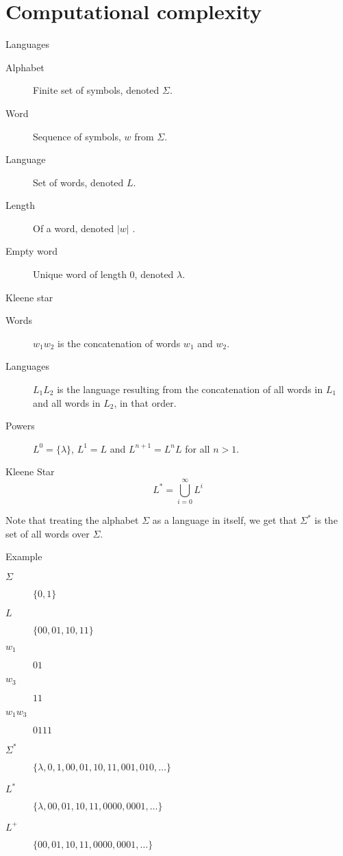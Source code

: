 
\section{Computational complexity}


\begin{frame}{Languages}
  \begin{description}
    \item[Alphabet] Finite set of symbols, denoted $\Sigma$.
    \item[Word] Sequence of symbols, $w$ from $\Sigma$.
    \item[Language] Set of words, denoted $L$.
    \item[Length] Of a word, denoted $|w|$  .
    \item[Empty word] Unique word of length 0, denoted $\lambda$.
  \end{description}
\end{frame}


\begin{frame}{Kleene star}
  \begin{description}
    \item[Words] $w_1 w_2$ is the concatenation of words $w_1$ and $w_2$.
    \item[Languages] $L_1 L_2$ is the language resulting from the concatenation of all words in $L_1$ and all words in $L_2$, in that order.
    \item[Powers] $L^0 = \{ \lambda \}$, $L^1 = L$ and $L^{n+1} = L^n L$ for all $n > 1$.
  \end{description}
  
  \vspace{0.5cm}
  
  \begin{block}{Kleene Star}
     \[ L^* =  \bigcup_{i=0}^{\infty} L^i \]
  \end{block}
  
  Note that treating the alphabet $\Sigma$ as a language in itself, we get that $\Sigma^*$ is the set of all words over $\Sigma$.
\end{frame}


\begin{frame}{Example}
  \begin{description}
    \item[$\Sigma$] $\{ 0, 1 \}$
    \item[$L$] $\{ 00, 01, 10, 11 \}$
    \item[$w_1$] $01$
    \item[$w_3$] $11$
    \item[$w_1 w_3$] $0111$
    \item[$\Sigma^*$] $\{ \lambda, 0, 1, 00, 01, 10, 11, 001, 010, \ldots \}$
    \item[$L^*$] $\{ \lambda, 00, 01, 10, 11, 0000, 0001, \ldots \}$
    \item[$L^+$] $\{ 00, 01, 10, 11, 0000, 0001, \ldots \}$
  \end{description}
\end{frame}


